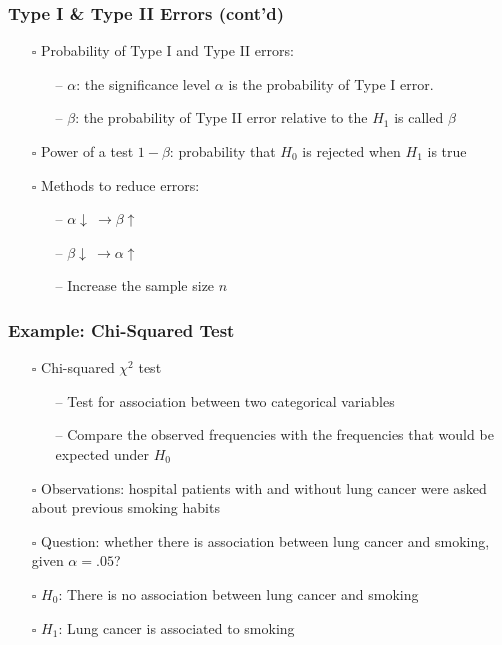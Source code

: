 \documentclass[handout]{beamer}
\begin{document}
\begin{frame}
    \frametitle{Type I \& Type II Errors (cont'd)}
    \begin{itemize}[wide = 0pt]
        \item[$\square$] Probability of Type I and Type II errors:
        \begin{itemize}
            \item[--] \textbf{$\alpha$}: the significance level $\alpha$ is the probability of Type I error.
            \item[--] \textbf{$\beta$}: the probability of Type II error relative to the $H_1$ is called $\beta$
        \end{itemize}
        \item[$\square$] Power of a test $1-\beta$: probability that $H_0$ is rejected when $H_1$ is true
        \item[$\square$] Methods to reduce errors:
        \begin{itemize}
            \item[--] $\alpha \downarrow \  \longrightarrow \beta \uparrow$
            \item[--] $\beta \downarrow \  \longrightarrow \alpha \uparrow$
            \item[--] Increase the {\color{red}sample size} $n$
        \end{itemize}
    \end{itemize} 
    \vspace*{\fill}
\end{frame}

\begin{frame}
    \frametitle{Example: Chi-Squared Test}
    \begin{itemize}[wide = 0pt]
        \item[$\square$] Chi-squared $\chi^2$ test
        \begin{itemize}
            \item[--] Test for {\color{red}association} between {\color{red}two categorical variables}
            \item[--] Compare the observed frequencies with the frequencies that would be expected under $H_0$
        \end{itemize}
        \item[$\square$] Observations: hospital patients with and without lung cancer were asked about previous smoking habits
        \item[$\square$] Question: whether there is association between lung cancer and smoking, given $\alpha=.05$?
        \item[$\square$] \textbf{$H_0$}: There is no association between lung cancer and smoking
        \item[$\square$] \textbf{$H_1$}: Lung cancer is associated to smoking
    \end{itemize} 
    \vspace*{\fill}
\end{frame}
 
\end{document}
